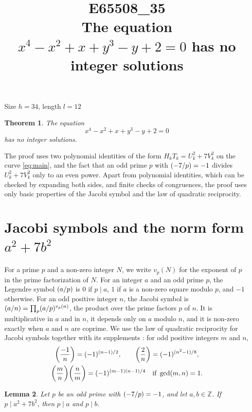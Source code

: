 \documentclass[11pt]{article}
\title{\textbf{E65508\_35}\\[4pt] {\Large The equation $x^{4}-x^{2}+x+y^{3}-y+2=0$ has no integer solutions}}
\author{}
\date{}
\newtheorem{theorem}{Theorem}
\newtheorem{lemma}[theorem]{Lemma}
\newcommand{\Z}{\mathbb{Z}}
\newcommand{\leg}[2]{\mathchoice{\biggl(\dfrac{#1}{#2}\biggr)}{(#1/#2)}{(#1/#2)}{(#1/#2)}}
\begin{document}
\maketitle
\vspace{-8ex}
\begin{center}
Size $h=34$, length $l=12$
\end{center}

\begin{theorem}\label{thm:main}
The equation
\begin{equation}\label{eq:main}
x^{4}-x^{2}+x+y^{3}-y+2=0
\end{equation}
has no integer solutions.
\end{theorem}

The proof uses two polynomial identities of the form $H_kT_k=U_k^2+7V_k^2$ on the curve \eqref{eq:main}, and the fact that an odd prime $p$ with $\leg{-7}{p}=-1$ divides $U_k^2+7V_k^2$ only to an even power. Apart from polynomial identities, which can be checked by expanding both sides, and finite checks of congruences, the proof uses only basic properties of the Jacobi symbol and the law of quadratic reciprocity.

\section{\texorpdfstring{Jacobi symbols and the norm form $a^2+7b^2$}{Jacobi symbols and the norm form}}

For a prime $p$ and a non-zero integer $N$, we write $v_p(N)$ for the exponent of $p$ in the prime factorization of $N$. For an integer $a$ and an odd prime $p$, the Legendre symbol $\leg{a}{p}$ is $0$ if $p\mid a$, $1$ if $a$ is a non-zero square modulo $p$, and $-1$ otherwise. For an odd positive integer $n$, the Jacobi symbol is $\leg{a}{n}=\prod_p\leg{a}{p}^{v_p(n)}$, the product over the prime factors $p$ of $n$. It is multiplicative in $a$ and in $n$, it depends only on $a$ modulo $n$, and it is non-zero exactly when $a$ and $n$ are coprime. We use the law of quadratic reciprocity for Jacobi symbols together with its supplements \cite[Chapter~5, \S2]{IR}: for odd positive integers $m$ and $n$,
\begin{gather*}
\leg{-1}{n}=(-1)^{(n-1)/2},\qquad\leg{2}{n}=(-1)^{(n^2-1)/8},\\
\leg{m}{n}\leg{n}{m}=(-1)^{(m-1)(n-1)/4}\quad\text{if }\gcd(m,n)=1.
\end{gather*}

\begin{lemma}\label{lem:divides}
Let $p$ be an odd prime with $\leg{-7}{p}=-1$, and let $a,b\in\Z$. If $p\mid a^2+7b^2$, then $p\mid a$ and $p\mid b$.
\end{lemma}
\end{document}
